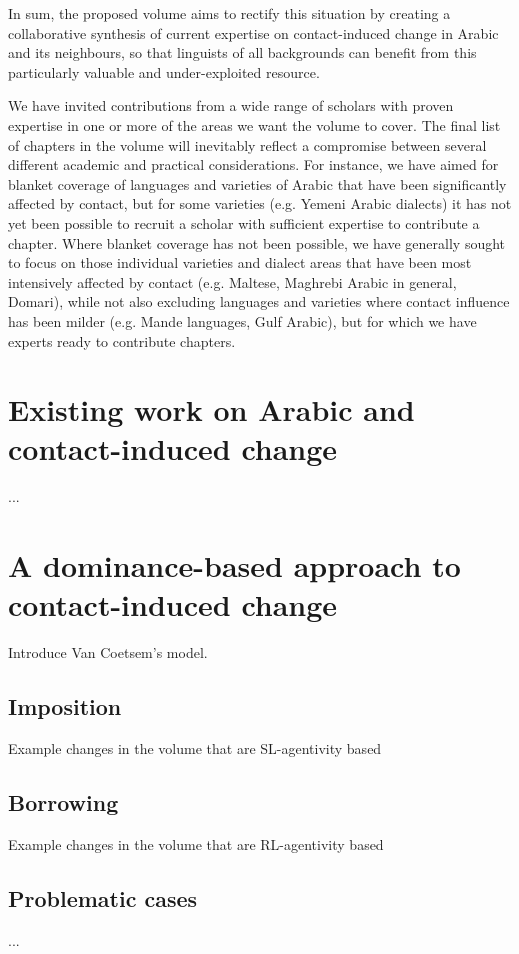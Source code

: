 \documentclass[output=paper]{langsci/langscibook}
\begin{document}
In sum, the proposed volume aims to rectify this situation by creating a collaborative synthesis of current expertise on contact-induced change in Arabic and its neighbours, so that linguists of all backgrounds can benefit from this particularly valuable and under-exploited resource.

We have invited contributions from a wide range of scholars with proven expertise in one or more of the areas we want the volume to cover. The final list of chapters in the volume will inevitably reflect a compromise between several different academic and practical considerations. For instance, we have aimed for blanket coverage of languages and varieties of Arabic that have been significantly affected by contact, but for some varieties (e.g. Yemeni Arabic dialects) it has not yet been possible to recruit a scholar with sufficient expertise to contribute a chapter. Where blanket coverage has not been possible, we have generally sought to focus on those individual varieties and dialect areas that have been most intensively affected by contact (e.g. Maltese, Maghrebi Arabic in general, Domari), while not also excluding languages and varieties where contact influence has been milder (e.g. Mande languages, Gulf Arabic), but for which we have experts ready to contribute chapters.




\section{Existing work on Arabic and contact-induced change}
...

\section{A dominance-based approach to contact-induced change}
Introduce Van Coetsem's model.

\subsection{Imposition}
Example changes in the volume that are SL-agentivity based

\subsection{Borrowing}
Example changes in the volume that are RL-agentivity based

\subsection{Problematic cases}
...
\end{document}
